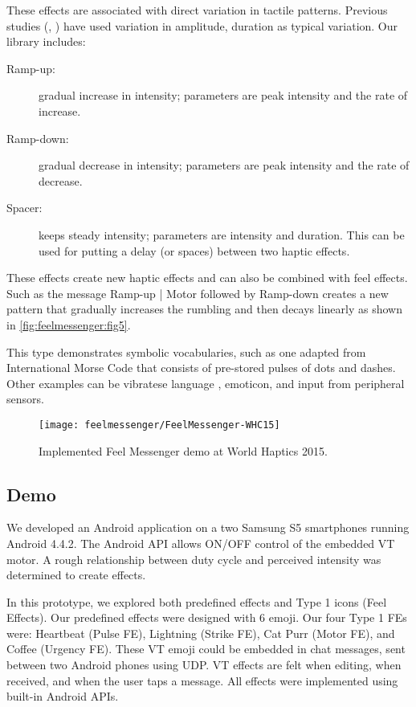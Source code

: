 These effects are associated with direct variation in tactile patterns. Previous studies (\eg, \cite{Brewster2004,MacLean2003}) have used variation in amplitude, duration as typical variation. Our library includes:

\begin{description}
	\item[Ramp-up:] gradual increase in intensity; parameters are peak intensity and the rate of increase.
	\item[Ramp-down:] gradual decrease in intensity; parameters are peak intensity and the rate of decrease.
	\item[Spacer:] keeps steady intensity; parameters are intensity and duration. This can be used for putting a delay (or spaces) between two haptic effects.
\end{description}

These effects create new haptic effects and can also be combined with feel effects. Such as the message Ramp-up | Motor followed by Ramp-down creates a new pattern that gradually increases the rumbling and then decays linearly as shown in \autoref{fig:feelmessenger:fig5}.

This type demonstrates symbolic vocabularies, such as one adapted from International Morse Code that consists of pre-stored pulses of dots and dashes. Other examples can be vibratese language \cite{Tan1997}, emoticon, and input from peripheral sensors.



\begin{figure}[htbp] %
   \centering
   \texttt{[image: feelmessenger/FeelMessenger-WHC15]} 
   \caption{Implemented Feel Messenger demo at World Haptics 2015.}
   \label{fig:feelmessenger:demo}
\end{figure}

\subsection{Demo}
We developed an Android application on a two Samsung S5 smartphones running Android 4.4.2.
The Android API allows ON/OFF control of the embedded VT motor.
A rough relationship between duty cycle and perceived intensity was determined to create effects.

In this prototype, we explored both predefined effects and Type 1 icons (Feel Effects).
Our predefined effects were designed with 6 emoji.
Our four Type 1 FEs were:
Heartbeat (Pulse FE),
Lightning (Strike FE),
Cat Purr (Motor FE), and
Coffee (Urgency FE).
These VT emoji could be embedded in chat messages, sent between two Android phones using UDP.
VT effects are felt when editing, when received, and when the user taps a message.
All effects were implemented using built-in Android APIs.


